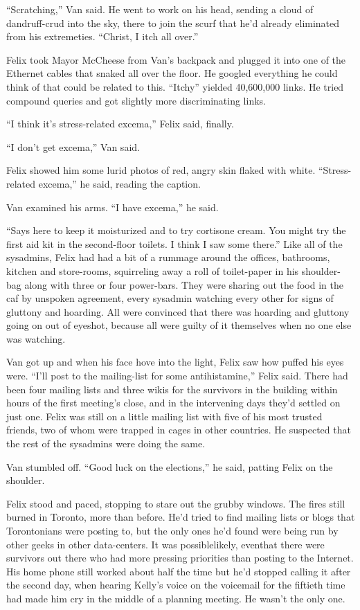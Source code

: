 “Scratching,” Van said. He went to work on his head, sending a
cloud of dandruff-crud into the sky, there to join the scurf that
he’d already eliminated from his extremeties. “Christ, I itch all
over.”

Felix took Mayor McCheese from Van’s backpack and plugged it into
one of the Ethernet cables that snaked all over the floor. He
googled everything he could think of that could be related to this.
“Itchy” yielded 40,600,000 links. He tried compound queries and got
slightly more discriminating links.

“I think it’s stress-related excema,” Felix said, finally.

“I don’t get excema,” Van said.

Felix showed him some lurid photos of red, angry skin flaked with
white. “Stress-related excema,” he said, reading the caption.

Van examined his arms. “I have excema,” he said.

“Says here to keep it moisturized and to try cortisone cream. You
might try the first aid kit in the second-floor toilets. I think I
saw some there.” Like all of the sysadmins, Felix had had a bit of
a rummage around the offices, bathrooms, kitchen and store-rooms,
squirreling away a roll of toilet-paper in his shoulder-bag along
with three or four power-bars. They were sharing out the food in
the caf by unspoken agreement, every sysadmin watching every other
for signs of gluttony and hoarding. All were convinced that there
was hoarding and gluttony going on out of eyeshot, because all were
guilty of it themselves when no one else was watching.

Van got up and when his face hove into the light, Felix saw how
puffed his eyes were. “I’ll post to the mailing-list for some
antihistamine,” Felix said. There had been four mailing lists and
three wikis for the survivors in the building within hours of the
first meeting’s close, and in the intervening days they’d settled
on just one. Felix was still on a little mailing list with five of
his most trusted friends, two of whom were trapped in cages in
other countries. He suspected that the rest of the sysadmins were
doing the same.

Van stumbled off. “Good luck on the elections,” he said, patting
Felix on the shoulder.

Felix stood and paced, stopping to stare out the grubby windows.
The fires still burned in Toronto, more than before. He’d tried to
find mailing lists or blogs that Torontonians were posting to, but
the only ones he’d found were being run by other geeks in other
data-centers. It was possible\dash{}likely, even\dash{}that there were
survivors out there who had more pressing priorities than posting
to the Internet. His home phone still worked about half the time
but he’d stopped calling it after the second day, when hearing
Kelly’s voice on the voicemail for the fiftieth time had made him
cry in the middle of a planning meeting. He wasn’t the only one.

